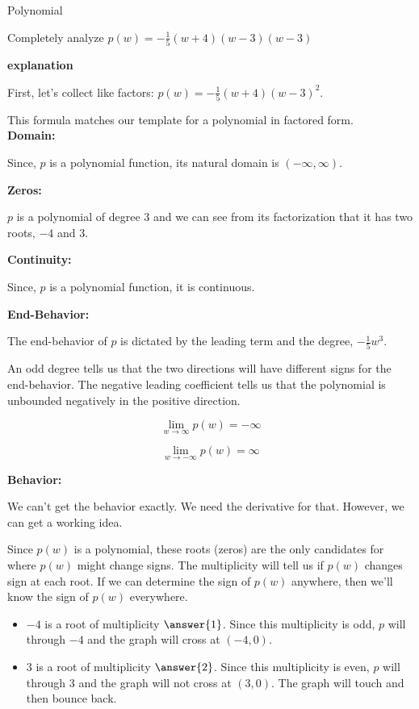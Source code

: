 \documentclass{ximera}
\begin{document}
\begin{example} Polynomial


Completely analyze $p(w) = -\frac{1}{5}(w+4)(w-3)(w-3)$

\textbf{\textcolor{red!75!green}{explanation}} 




First, let's collect like factors: $p(w) = -\frac{1}{5}(w+4)(w-3)^2$.


This formula matches our template for a polynomial in factored form. \\

\textbf{Domain:}

Since, $p$ is a polynomial function, its natural domain is $(-\infty, \infty)$. 



\textbf{Zeros:}



$p$ is a polynomial of degree $3$ and we can see from its factorization that it has two roots, $-4$ and $3$. 




\textbf{Continuity:}

Since, $p$ is a polynomial function, it is continuous. 



\textbf{End-Behavior:}


The end-behavior of $p$ is dictated by the leading term and the degree, $-\frac{1}{5} w^3$.  

An odd degree tells us that the two directions will have different signs for the end-behavior.  The negative leading coefficient tells us that the polynomial is unbounded negatively in the positive direction.


\[
\lim\limits_{w \to \infty}p(w) = -\infty
\]


\[
\lim\limits_{w \to -\infty}p(w) = \infty
\] 






\textbf{Behavior:}

We can't get the behavior exactly.  We need the derivative for that. However, we can get a working idea.

Since $p(w)$ is a polynomial, these roots (zeros) are the only candidates for where $p(w)$ might change signs.  The multiplicity will tell us if $p(w)$ changes sign at each root. If we can determine the sign of $p(w)$ anywhere, then we'll know the sign of $p(w)$ everywhere.

\begin{itemize}
\item $-4$ is a root of multiplicity $\answer{1}$.  Since this multiplicity is odd, $p$ will  through $-4$ and the graph will cross at $(-4,0)$.
\item $3$ is a root of multiplicity $\answer{2}$.  Since this multiplicity is even, $p$ will  through $3$ and the graph will not cross at $(3,0)$.  The graph will touch and then bounce back.
\end{itemize}






\end{example}
\end{document}
